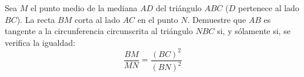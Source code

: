 Sea $M$ el punto medio de la mediana $AD$ del triángulo $ABC$ ($D$ pertenece al lado $BC$). La recta $BM$ corta al lado $AC$ en el punto $N$. Demuestre que $AB$ es tangente a la circunferencia circunscrita al triángulo $NBC$ si, y sólamente si, se verifica la igualdad:
\[ \frac{BM}{MN} = \frac{(BC)^2}{(BN)^2} \]
